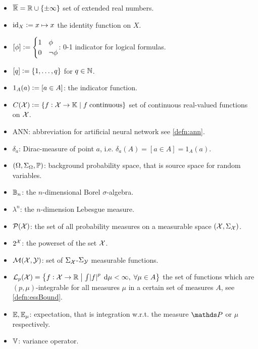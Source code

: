 
\begin{itemize}
  \item $\overline{\mathbb{R}} = \mathbb{R} \cup \{\pm \infty\}$ set of extended real numbers.
  \item $\text{id}_X \vcentcolon= x \mapsto x$ the identity function on $X$.
  \item $ [\phi] \vcentcolon= \begin{cases}
    1 & \phi \\ 0 & \neg \phi \end{cases}$: 0-1 indicator for logical formulas.
  \item $[q] \vcentcolon= \{1,\dots,q\}$ for $q\in \mathbb{N}$.
  \item $1_A(a) \vcentcolon= [a \in A]$: the indicator function.
  \item $C(\mathcal{X}) \vcentcolon= \{ f : \mathcal{X} \to \mathbb{K} \mid f \; \text{continuous} \}$
    set of continuous real-valued functions on $\mathcal{X}$.
  \item ANN: abbreviation for artificial neural network see \cref{defn:ann}.
  \item $\delta_a$: Dirac-measure of point $a$,
    i.e. $\delta_a(A) = [a \in A] = 1_A(a)$.
  \item $(\Omega, \Sigma_\Omega, \mathbb{P})$: background probability space,
    that is source space for random variables.
  \item $\mathbb{B}_n$: the $n$-dimensional Borel $\sigma$-algebra.
  \item $\lambda^n$: the $n$-dimension Lebesgue measure.
  \item $\mathcal{P}(\mathcal{X})$: the set of all probability measures on a
    measurable space $(\mathcal{X}, \Sigma_\mathcal{X})$.
  \item $2^\mathcal{X}$: the powerset of the set $\mathcal{X}$.
  \item $\mathcal{M}(\mathcal{X}, \mathcal{Y})$:
    set of $\Sigma_\mathcal{X}$-$\Sigma_\mathcal{Y}$ measurable functions.
  \item $\mathcal{L}_p(\mathcal{X}) = \left\{ f : \mathcal{X} \to \mathbb{R} \;\middle\vert\;
    \int \abs{f}^p \; \mathrm{d} \mu < \infty, \; \forall \mu \in A \right\}$
    the set of functions which are
    $(p, \mu)$-integrable for all measures $\mu$ in a certain
    set of measures $A$, see \cref{defn:essBound}.
  \item $\mathbb{E}, \mathbb{E}_\mu$: expectation, that is integration
    w.r.t. the measure $\Prob$ or $\mu$ respectively.
  \item $\mathbb{V}$: variance operator.
\end{itemize}
